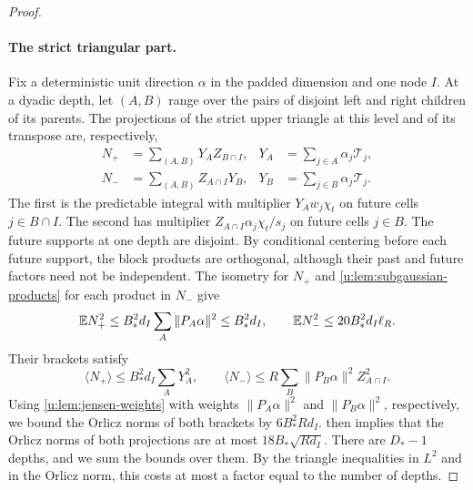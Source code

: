 \begin{proof}
\paragraph{The strict triangular part.}
Fix a deterministic unit direction $\alpha$ in the padded dimension
and one node $I$. At a dyadic depth, let $(A,B)$ range over the pairs of
disjoint left and right children of its parents. The projections of
the strict upper triangle at this level and of its transpose are,
respectively,
\[
\begin{aligned}
 N_+&=\sum_{(A,B)}Y_AZ_{B\cap I},
 &Y_A&=\sum_{j\in A}\alpha_j\mathcal T_j,\\
 N_-&=\sum_{(A,B)}Z_{A\cap I}Y_B,
 &Y_B&=\sum_{j\in B}\alpha_j\mathcal T_j.
\end{aligned}
\]
The first is the predictable integral with multiplier $Y_Aw_j\chi_t$
on future cells $j\in B\cap I$. The second has multiplier
$Z_{A\cap I}\alpha_j\chi_t/s_j$ on future cells $j\in B$.
The future supports at one depth are disjoint. By conditional centering
before each future support, the block products are orthogonal, although
their past and future factors need not be independent. The isometry for
$N_+$ and \cref{u:lem:subgaussian-products} for each product in $N_-$
give
\begin{equation}\label{u:eq:dyadic-level-variance}
 \mathbb E N_+^2\le B_*^2d_I\sum_A\|P_A\alpha\|^2\le B_*^2d_I,
 \qquad
 \mathbb E N_-^2\le20B_*^2d_I\ell_R.
\end{equation}
Their brackets satisfy
\begin{equation}\label{u:eq:dyadic-level-brackets}
 \langle N_+\rangle\le B_*^2d_I\sum_AY_A^2,\qquad
 \langle N_-\rangle
 \le R\sum_B\|P_B\alpha\|^2Z_{A\cap I}^2.
\end{equation}
Using \cref{u:lem:jensen-weights} with weights $\|P_A\alpha\|^2$
and $\|P_B\alpha\|^2$, respectively, we bound the Orlicz norms of
both brackets by $6B_*^2Rd_I$.  then implies
that the Orlicz norms of both projections are at most
$18B_*\sqrt{Rd_I}$. There are $D_*-1$ depths, and we sum the bounds
over them. By the triangle inequalities in $L^2$ and in the Orlicz
norm, this costs at most a factor equal to the number of depths.


\end{proof}
